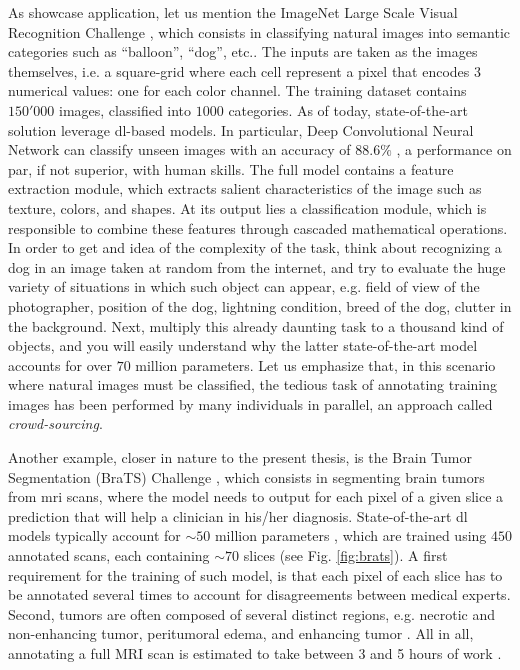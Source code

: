 As showcase application, let us mention the ImageNet Large Scale Visual Recognition Challenge \cite{ILSVRC15}, which consists in classifying natural images into semantic categories such as ``balloon'', ``dog'', etc..
The inputs are taken as the images themselves, i.e. a square-grid where each cell represent a pixel that encodes $3$ numerical values: one for each color channel.
The training dataset contains $150'000$ images, classified into $1000$ categories.
As of today, state-of-the-art solution leverage \gls{dl}-based models.
In particular, Deep Convolutional Neural Network can classify unseen images with an accuracy of $88.6\%$ \cite{tan19}, a performance on par, if not superior, with human skills.
The full model contains a feature extraction module, which extracts salient characteristics of the image such as texture, colors, and shapes.
At its output lies a classification module, which is responsible to combine these features through cascaded mathematical operations.
In order to get and idea of the complexity of the task, think about recognizing a dog in an image taken at random from the internet, and try to evaluate the huge variety of situations in which such object can appear, e.g. field of view of the photographer, position of the dog, lightning condition, breed of the dog, clutter in the background.
Next, multiply this already daunting task to a thousand kind of objects, and you will easily understand why the latter state-of-the-art model accounts for over $70$ million parameters.
Let us emphasize that, in this scenario where natural images must be classified, the tedious task of annotating training images has been performed by many individuals in parallel, an approach called \textit{crowd-sourcing}.

Another example, closer in nature to the present thesis, is the Brain Tumor Segmentation (BraTS) Challenge \cite{menze15}, which consists in segmenting brain tumors from \gls{mri} scans, where the model needs to output for each pixel of a given slice a prediction that will help a clinician in his/her diagnosis.
State-of-the-art \gls{dl} models typically account for $\sim 50$ million parameters \cite{chen19}, which are trained using $450$ annotated scans, each containing $\sim 70$ slices (see Fig. \ref{fig:brats}).
A first requirement for the training of such model, is that each pixel of each slice has to be annotated several times to account for disagreements between medical experts.
Second, tumors are often composed of several distinct regions, e.g. necrotic and non-enhancing tumor, peritumoral edema, and enhancing tumor \cite{akil20}.
All in all, annotating a full MRI scan is estimated to take between 3 and 5 hours of work \cite{kaus01}.


